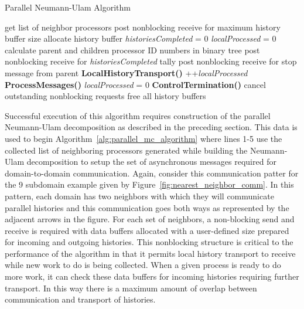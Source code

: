 \begin{algorithm}[h!]
  \caption{Parallel Neumann-Ulam Algorithm}
  \label{alg:parallel_mc_algorithm}
  \begin{algorithmic}[1]
    \State get list of neighbor processors 
    \State post nonblocking receive for maximum history buffer size
    \State allocate history buffer
    \EndFor
    \State \textit{historiesCompleted} = 0
    \State \textit{localProcessed} = 0
    \State calculate parent and children processor ID numbers in
    binary tree
    \State post nonblocking receive for \textit{historiesCompleted} tally
    \EndFor
    \State post nonblocking receive for stop message from parent
    \State \textbf{LocalHistoryTransport()}
    \State ++\textit{localProcessed}
    \EndIf
    \State \textbf{ProcessMessages()}
    \State \textit{localProcessed} = 0
    \EndIf
    \State \textbf{ControlTermination()}
    \EndIf
    \EndWhile
    \State cancel outstanding nonblocking requests
    \State free all history buffers
  \end{algorithmic}
\end{algorithm}

Successful execution of this algorithm requires construction of the
parallel Neumann-Ulam decomposition as described in the preceding
section. This data is used to begin
Algorithm~\ref{alg:parallel_mc_algorithm} where lines 1-5 use the
collected list of neighboring processors generated while building the
Neumann-Ulam decomposition to setup the set of asynchronous messages
required for domain-to-domain communication. Again, consider this
communication patter for the 9 subdomain example given by
Figure~\ref{fig:nearest_neighbor_comm}. In this pattern, each domain
has two neighbors with which they will communicate parallel histories
and this communication goes both ways as represented by the adjacent
arrows in the figure. For each set of neighbors, a non-blocking send
and receive is required with data buffers allocated with a
user-defined size prepared for incoming and outgoing histories. This
nonblocking structure is critical to the performance of the algorithm
in that it permits local history transport to receive while new work
to do is being collected. When a given process is ready to do more
work, it can check these data buffers for incoming histories requiring
further transport. In this way there is a maximum amount of overlap
between communication and transport of histories.


